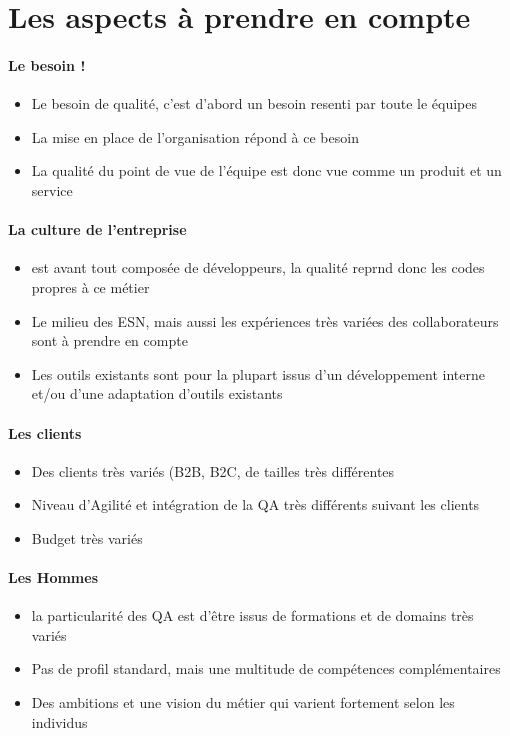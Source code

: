\section{Les aspects à prendre en compte}

\begin{frame}{\insertsectionhead}
  \framesubtitle{Le besoin !}
  \begin{itemize}
    \item Le besoin de qualité, c'est d'abord un besoin resenti par toute le équipes
    \item La mise en place de l'organisation répond à ce besoin
    \item La qualité du point de vue de l'équipe est donc vue comme un produit et un service
  \end{itemize}
\end{frame}

\begin{frame}{\insertsectionhead}
  \framesubtitle{La culture de l'entreprise}
  \begin{itemize}
    \item \datasolution est avant tout composée de développeurs, la qualité reprnd donc les codes propres à ce métier
    \item Le milieu des ESN, mais aussi les expériences très variées des collaborateurs sont à prendre en compte
    \item Les outils existants sont pour la plupart issus d'un développement interne et/ou d'une adaptation d'outils existants
  \end{itemize}
\end{frame}

\begin{frame}{\insertsectionhead}
  \framesubtitle{Les clients}
  \begin{itemize}
    \item Des clients très variés (B2B, B2C, de tailles très différentes
    \item Niveau d'Agilité et intégration de la QA très différents suivant les clients
    \item Budget très variés
  \end{itemize}
\end{frame}

\begin{frame}{\insertsectionhead}
  \framesubtitle{Les Hommes}
  \begin{itemize}
    \item la particularité des QA est d'être issus de formations et de domains très variés
    \item Pas de profil standard, mais une multitude de compétences complémentaires
    \item Des ambitions et une vision du métier qui varient fortement selon les individus
  \end{itemize}
\end{frame}

